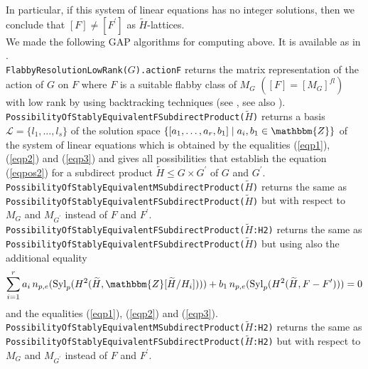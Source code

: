\documentclass{amsart}
\theoremstyle{plain}
\theoremstyle{definition}
\theoremstyle{remark}
\newcommand{\bZ}{\mathbbm{Z}}\newcommand{\bQ}{\mathbbm{Q}}
\newcommand{\Syl}{{\rm Syl}}
\newcounter{sub}\def\tr{\mbox{tr }}
\begin{document}
In particular, if this system of linear equations has no integer solutions, 
then we conclude that $[F]\neq [F^\prime]$ as $\widetilde{H}$-lattices. \\

We made the following GAP \cite{GAP} algorithms for computing above. 
It is available as in \cite{BCAlgTori}.\\

\noindent 
{\tt FlabbyResolutionLowRank($G$).actionF} returns 
the matrix representation of the action of $G$ on $F$ 
where $F$ is a suitable flabby class of $M_G$ $([F]=[M_G]^{fl})$ 
with low rank by using backtracking techniques 
(see \cite[Chapter 5]{HY17}, see also \cite[Algorithm 4.1 (3)]{HHY20}).\\

\noindent 
{\tt PossibilityOfStablyEquivalentFSubdirectProduct($\widetilde{H}$)} 
returns a basis 
$\mathcal{L}=\{l_1,\dots,l_s\}$ of the solution space 
$\{[a_1,\ldots,a_r,b_1]\mid a_i, b_1\in\bZ\}$ 
of the system of linear equations which is obtained by the equalities 
(\ref{eqp1}), (\ref{eqp2}) and (\ref{eqp3}) 
and gives all possibilities that establish the equation (\ref{eqpos2})
for a subdirect product 
$\widetilde{H}\leq G\times G^\prime$ of $G$ and $G^\prime$.\\

\noindent 
{\tt PossibilityOfStablyEquivalentMSubdirectProduct($\widetilde{H}$)} 
returns the same as\\ 
{\tt PossibilityOfStablyEquivalentFSubdirectProduct($\widetilde{H}$)} 
but with respect to $M_G$ and $M_{G^\prime}$ 
instead of $F$ and $F^\prime$.\\

\noindent 
{\tt PossibilityOfStablyEquivalentFSubdirectProduct($\widetilde{H}$:H2)} 
returns the same as\\ 
{\tt PossibilityOfStablyEquivalentFSubdirectProduct($\widetilde{H}$)} 
but using also the additional equality 
\begin{align}
\sum_{i=1}^r a_i\, n_{p,e}(\Syl_p(H^2(\widetilde{H},\bZ[\widetilde{H}/H_i])))+b_1\, n_{p,e}(\Syl_p(H^2(\widetilde{H},F-F^\prime)))=0\label{eqp4}
\end{align}
and the equalities (\ref{eqp1}), (\ref{eqp2}) and (\ref{eqp3}).\\

\noindent 
{\tt PossibilityOfStablyEquivalentMSubdirectProduct($\widetilde{H}$:H2)} 
returns the same as\\ 
{\tt PossibilityOfStablyEquivalentFSubdirectProduct($\widetilde{H}$:H2)} 
but with respect to $M_G$ and $M_{G^\prime}$ 
instead of $F$ and $F^\prime$.\\
\end{document}
